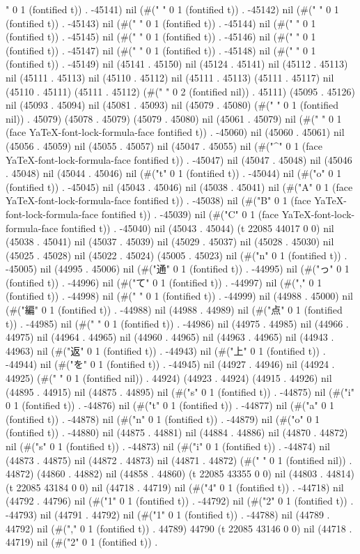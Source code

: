 " 0 1 (fontified t)) . -45141) nil (#(" " 0 1 (fontified t)) . -45142) nil (#(" " 0 1 (fontified t)) . -45143) nil (#(" " 0 1 (fontified t)) . -45144) nil (#(" " 0 1 (fontified t)) . -45145) nil (#(" " 0 1 (fontified t)) . -45146) nil (#(" " 0 1 (fontified t)) . -45147) nil (#(" " 0 1 (fontified t)) . -45148) nil (#(" " 0 1 (fontified t)) . -45149) nil (45141 . 45150) nil (45124 . 45141) nil (45112 . 45113) nil (45111 . 45113) nil (45110 . 45112) nil (45111 . 45113) (45111 . 45117) nil (45110 . 45111) (45111 . 45112) (#("  " 0 2 (fontified nil)) . 45111) (45095 . 45126) nil (45093 . 45094) nil (45081 . 45093) nil (45079 . 45080) (#(" " 0 1 (fontified nil)) . 45079) (45078 . 45079) (45079 . 45080) nil (45061 . 45079) nil (#(" " 0 1 (face YaTeX-font-lock-formula-face fontified t)) . -45060) nil (45060 . 45061) nil (45056 . 45059) nil (45055 . 45057) nil (45047 . 45055) nil (#("^" 0 1 (face YaTeX-font-lock-formula-face fontified t)) . -45047) nil (45047 . 45048) nil (45046 . 45048) nil (45044 . 45046) nil (#("t" 0 1 (fontified t)) . -45044) nil (#("o" 0 1 (fontified t)) . -45045) nil (45043 . 45046) nil (45038 . 45041) nil (#("A" 0 1 (face YaTeX-font-lock-formula-face fontified t)) . -45038) nil (#("B" 0 1 (face YaTeX-font-lock-formula-face fontified t)) . -45039) nil (#("C" 0 1 (face YaTeX-font-lock-formula-face fontified t)) . -45040) nil (45043 . 45044) (t 22085 44017 0 0) nil (45038 . 45041) nil (45037 . 45039) nil (45029 . 45037) nil (45028 . 45030) nil (45025 . 45028) nil (45022 . 45024) (45005 . 45023) nil (#("n" 0 1 (fontified t)) . -45005) nil (44995 . 45006) nil (#("通" 0 1 (fontified t)) . -44995) nil (#("っ" 0 1 (fontified t)) . -44996) nil (#("て" 0 1 (fontified t)) . -44997) nil (#("," 0 1 (fontified t)) . -44998) nil (#(" " 0 1 (fontified t)) . -44999) nil (44988 . 45000) nil (#("編" 0 1 (fontified t)) . -44988) nil (44988 . 44989) nil (#("点" 0 1 (fontified t)) . -44985) nil (#(" " 0 1 (fontified t)) . -44986) nil (44975 . 44985) nil (44966 . 44975) nil (44964 . 44965) nil (44960 . 44965) nil (44963 . 44965) nil (44943 . 44963) nil (#("返" 0 1 (fontified t)) . -44943) nil (#("上" 0 1 (fontified t)) . -44944) nil (#("を" 0 1 (fontified t)) . -44945) nil (44927 . 44946) nil (44924 . 44925) (#(" " 0 1 (fontified nil)) . 44924) (44923 . 44924) (44915 . 44926) nil (44895 . 44915) nil (44875 . 44895) nil (#("s" 0 1 (fontified t)) . -44875) nil (#("i" 0 1 (fontified t)) . -44876) nil (#("t" 0 1 (fontified t)) . -44877) nil (#("a" 0 1 (fontified t)) . -44878) nil (#("n" 0 1 (fontified t)) . -44879) nil (#("o" 0 1 (fontified t)) . -44880) nil (44875 . 44881) nil (44884 . 44886) nil (44870 . 44872) nil (#("s" 0 1 (fontified t)) . -44873) nil (#("i" 0 1 (fontified t)) . -44874) nil (44873 . 44875) nil (44872 . 44873) nil (44871 . 44872) (#(" " 0 1 (fontified nil)) . 44872) (44860 . 44882) nil (44858 . 44860) (t 22085 43355 0 0) nil (44803 . 44814) (t 22085 43184 0 0) nil (44718 . 44719) nil (#("4" 0 1 (fontified t)) . -44718) nil (44792 . 44796) nil (#("1" 0 1 (fontified t)) . -44792) nil (#("2" 0 1 (fontified t)) . -44793) nil (44791 . 44792) nil (#("1" 0 1 (fontified t)) . -44788) nil (44789 . 44792) nil (#("," 0 1 (fontified t)) . 44789) 44790 (t 22085 43146 0 0) nil (44718 . 44719) nil (#("2" 0 1 (fontified t)) . 